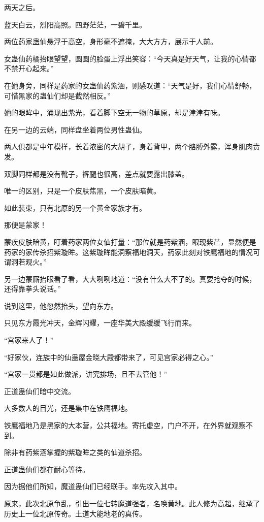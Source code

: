 
\begin{this_body}

两天之后。

蓝天白云，烈阳高照。四野茫茫，一碧千里。

两位药家蛊仙悬浮于高空，身形毫不遮掩，大大方方，展示于人前。

女蛊仙药橘抬眼望望，圆圆的脸蛋上浮出笑容：“今天真是好天气，让我的心情都不禁开心起来。”

在她身旁，同样是药家的女蛊仙药紫涵，则感叹道：“天气是好，我们心情舒畅，可惜黑家的蛊仙们却是截然相反。”

她的眼眸中，涌现出紫光，看着脚下空无一物的草原，却是津津有味。

在另一边的云端，同样盘坐着两位男性蛊仙。

两人俱都是中年模样，长着浓密的大胡子，身着背甲，两个胳膊外露，浑身肌肉贲发。

双脚同样都是没有靴子，裤腿也很高，差点就要露出膝盖。

唯一的区别，只是一个皮肤焦黑，一个皮肤暗黄。

如此装束，只有北原的另一个黄金家族才有。

那便是蒙家！

蒙疾皮肤暗黄，盯着药家两位女仙打量：“那位就是药紫涵，眼现紫芒，显然便是药家的家传杀招紫璇眸。这紫璇眸能洞察福地洞天，药家此刻对铁鹰福地的情况可谓洞若观火。”

另一边蒙厮抬眼看了看，大大咧咧地道：“没有什么大不了的。真要抢夺的时候，还得靠拳头说话。”

说到这里，他忽然抬头，望向东方。

只见东方霞光冲天，金辉闪耀，一座华美大殿缓缓飞行而来。

“宫家来人了！”

“好家伙，连族中的仙蛊屋金晓大殿都带来了，可见宫家必得之心。”

“宫家一贯都是如此做派，讲究排场，且不去管他！”

正道蛊仙们暗中交流。

大多数人的目光，还是集中在铁鹰福地。

铁鹰福地乃是黑家的大本营，公共福地。寄托虚空，门户不开，在外界就观察不到。

除非有药紫涵掌握的紫璇眸之类的仙道杀招。

正道蛊仙们都在耐心等待。

因为据他们所知，魔道蛊仙们已经联手。率先攻入其中。

原来，此次北原争乱，引出一位七转魔道强者，名唤黄地。此人修为高超，继承了历史上一位北原传奇。土道大能地老的真传。


\end{this_body}
